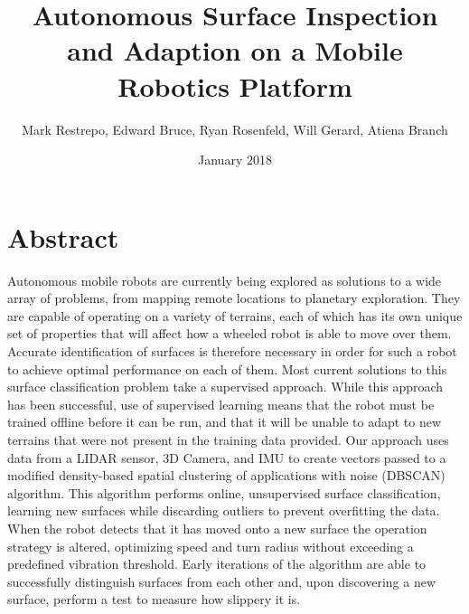 \documentclass{article}
\title{Autonomous Surface Inspection and Adaption on a Mobile Robotics Platform}
\author{Mark Restrepo, Edward Bruce, Ryan Rosenfeld, Will Gerard, Atiena Branch}
\date{January 2018}
\begin{document}
\section{Abstract}




Autonomous mobile robots are currently being explored as solutions to a wide array of problems, from mapping remote locations to planetary exploration. They are capable of operating on a variety of terrains, each of which has its own unique set of properties that will affect how a wheeled robot is able to move over them. Accurate identification of surfaces is therefore necessary in order for such a robot to achieve optimal performance on each of them. Most current solutions to this surface classification problem take a supervised approach. While this approach has been successful, use of supervised learning means that the robot must be trained offline before it can be run, and that it will be unable to adapt to new terrains that were not present in the training data provided. Our approach uses data from a LIDAR sensor, 3D Camera, and IMU to create vectors passed to a modified density-based spatial clustering of applications with noise (DBSCAN) algorithm. This algorithm performs online, unsupervised surface classification, learning new surfaces while discarding outliers to prevent overfitting the data. When the robot detects that it has moved onto a new surface the operation strategy is altered, optimizing speed and turn radius without exceeding a predefined vibration threshold. Early iterations of the algorithm are able to successfully distinguish surfaces from each other and, upon discovering a new surface, perform a test to measure how slippery it is.
\end{document}

